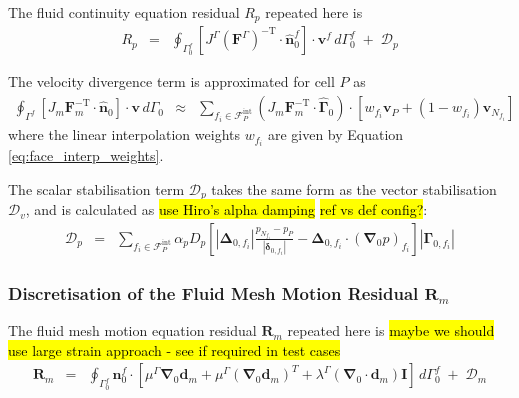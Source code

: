 \documentclass[sn-mathphys,Numbered]{sn-jnl}%
\newcommand{\bb}{\boldsymbol}
\begin{document}
The fluid continuity equation residual $R_p$ repeated here is
\begin{eqnarray}
    R_p    &=&	\oint_{\Gamma^f_0}  \left[ J^\Gamma (\bb{F}^\Gamma)^{-\text{T}}  \cdot \hat{\bb{n}}_0^f \right] \cdot \bb{v}^f \, d\Gamma^f_0 \;+\; \mathcal{D}_p
\end{eqnarray}

The velocity divergence term is approximated for cell $P$ as
\begin{eqnarray}
	\oint_{\Gamma^f}  \left[ J_m \bb{F}_m^{-\text{T}}  \cdot \hat{\bb{n}}_0 \right] \cdot \bb{v} \, d\Gamma_0
	&\approx&
		\sum_{f_i \in \mathcal{F}^{\text{int}}_P}
		\left( J_m \bb{F}_m^{-\text{T}}  \cdot \hat{\bb{\Gamma}}_0 \right)
		\cdot \left[ w_{f_i} \bb{v}_P + (1 - w_{f_i})\bb{v}_{N_{f_i}}  \right]
\end{eqnarray}
where the linear interpolation weights $w_{f_i}$ are given by Equation \ref{eq:face_interp_weights}.

The scalar stabilisation term $\mathcal{D}_p$ takes the same form as the vector stabilisation $\mathcal{D}_v$, and is calculated as \hl{use Hiro's alpha damping} \hl{ref vs def config?}:
\begin{eqnarray}
	\mathcal{D}_p
	&=& \sum_{f_i \in \mathcal{F}^{\text{int}}_P} \alpha_p D_p \left[
		\left|\bb{\Delta}_{0,f_i} \right| \frac{ p_{N_{f_i}} - p_P}{\left|\bb{\delta}_{0,f_i}\right|}	- \bb{\Delta}_{0,f_i} \cdot \left(\bb{\nabla}_0 p \right)_{f_i}
		\right]    \left|\bb{\Gamma}_{0,f_i}\right|
\end{eqnarray}



\subsubsection[Discretisation of the Fluid Mesh Motion Residual]{Discretisation of the Fluid Mesh Motion Residual $\bb{R}_m$}
The fluid mesh motion equation residual $\bb{R}_m$ repeated here is \hl{maybe we should use large strain approach - see if required in test cases}
\begin{eqnarray}
    \bb{R}_m
    &=&
    \oint_{\Gamma_0^f} \bb{n}_0^f \cdot
    \left[
    \mu^\Gamma \bb{\nabla}_0 \bb{d}_m + \mu^\Gamma \left(\bb{\nabla}_0 \bb{d}_m \right)^T
    + \lambda^\Gamma (\bb{\nabla}_0 \cdot \bb{d}_m) \textbf{I}
    \right]
    \, d\Gamma_0^f
    \;+\; \bb{\mathcal{D}}_m
\end{eqnarray}
\end{document}
